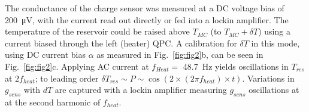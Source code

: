 \documentclass[twocolumn,showpacs,preprintnumbers,amsmath,amssymb,pra,aps,superscriptaddress]{revtex4-1}
\begin{document}
The conductance of the charge sensor was measured at a DC voltage bias of \SI{200}{\micro\volt}, with the current read out directly or fed into a lockin amplifier.  The temperature of the reservoir could be raised above $T_{MC}$ (to $T_{MC} + \delta T$) using a current biased through the left (heater) QPC. A calibration for $\delta T$ in this mode, using DC current bias $\alpha$ as measured in Fig.~\ref{fig:fig2}b, can be seen in Fig.~\ref{fig:fig2}c. Applying AC current at $f_{Heat} =$ \SI{48.7}{\hertz} yields oscillations in $T_{res}$ at $2f_{heat}$; to leading order $\delta T_{res} \sim P \sim \cos(2 \times (2 \pi f_{heat}) \times t)$. Variations in $g_{sens}$ with $dT$ are captured with a lockin amplifier measuring $g_{sens}$ oscillations at at the second harmonic of $f_{heat}$. 


{}

\end{document}

